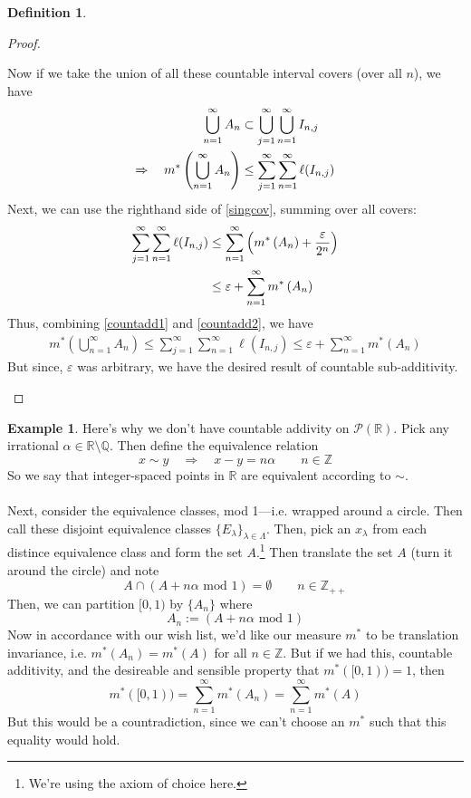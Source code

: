 \documentclass[12pt]{article}
\theoremstyle{plain}
\theoremstyle{definition}
\newtheorem{defn}[thm]{Definition}
\newtheorem{ex}[thm]{Example}
\theoremstyle{remark}
\begin{document}
\begin{defn}
\begin{proof}
\begin{enumerate}
Now if we take the union of all these countable interval covers (over all $n$), we have 
\begin{align}
    \bigcup^\infty_{n=1}A_n &\subset 
        \bigcup^\infty_{j=1} 
        \bigcup^\infty_{n=1} I_{n,j} \notag\\
    \Rightarrow \quad
    m^*\left(\bigcup^\infty_{n=1}A_n\right) 
    &\leq \sum^\infty_{j=1} \sum^\infty_{n=1}\ell(I_{n,j})
    \label{countadd1}
\end{align}
Next, we can use the righthand side of \ref{singcov}, summing over all covers:
\begin{align}
    \sum^\infty_{j=1} \sum^\infty_{n=1}\ell(I_{n,j})
    &\leq \sum^\infty_{n=1} \left(m^*\left(A_n\right) 
    + \frac{\varepsilon}{2^n}\right) \notag \\
    &\leq \varepsilon
    +\sum^\infty_{n=1} m^*\left(A_n\right) 
    \label{countadd2}
\end{align}
Thus, combining \ref{countadd1} and \ref{countadd2}, we have
\begin{align}
    m^*\left(\bigcup^\infty_{n=1}A_n\right) 
    \leq \sum^\infty_{j=1} \sum^\infty_{n=1}\ell(I_{n,j})
    \leq \varepsilon+\sum^\infty_{n=1} m^*\left(A_n\right)
\end{align}
But since, $\varepsilon$ was arbitrary, we have the desired result of countable sub-additivity.
\end{enumerate}
\end{proof}

\end{defn}



\begin{ex}
Here's why we don't have countable addivity on $\mathscr{P}(\mathbb{R})$. Pick any irrational $\alpha\in\mathbb{R}\setminus\mathbb{Q}$. Then define the equivalence relation
\[
    x\sim y 
    \quad \Rightarrow \quad
    x-y = n \alpha \qquad n \in\mathbb{Z}
\]
So we say that integer-spaced points in $\mathbb{R}$ are equivalent according to $\sim$. 
\\
\\
Next, consider the equivalence classes, mod 1---i.e. wrapped around a circle. Then call these disjoint equivalence classes $\{E_\lambda\}_{\lambda \in \Lambda}$. Then, pick an $x_\lambda$ from each distince equivalence class and form the set $A$.\footnote{We're using the axiom of choice here.} Then translate the set $A$ (turn it around the circle) and note
\[
    A \cap (A + n \alpha \text{ mod } 1 ) = \emptyset
    \qquad n \in \mathbb{Z}_{++}
\]
Then, we can partition $[0,1)$ by $\{A_n\}$ where
\[
    A_n := (A + n\alpha \text{ mod } 1)
\]
Now in accordance with our wish list, we'd like our measure $m^*$ to be translation invariance, i.e. $m^*(A_n) = m^*(A)$ for all $n\in\mathbb{Z}$. But if we had this, countable additivity, and the desireable and sensible property that $m^*([0,1))=1$, then
\[
    m^*([0,1)) = \sum^\infty_{n=1} m^*(A_n) = 
    \sum^\infty_{n=1} m^*(A) 
\]
But this would be a countradiction, since we can't choose an $m^*$ such that this equality would hold.


\end{ex}
\end{document}
